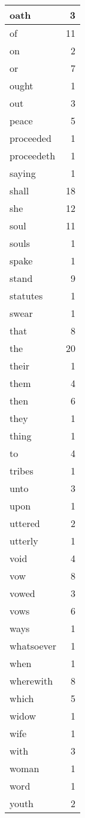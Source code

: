 \begin{center}
\begin{longtable}{l|r}
oath & 3\\ \hline 
of & 11\\ \hline 
on & 2\\ \hline 
or & 7\\ \hline 
ought & 1\\ \hline 
out & 3\\ \hline 
peace & 5\\ \hline 
proceeded & 1\\ \hline 
proceedeth & 1\\ \hline 
saying & 1\\ \hline 
shall & 18\\ \hline 
she & 12\\ \hline 
soul & 11\\ \hline 
souls & 1\\ \hline 
spake & 1\\ \hline 
stand & 9\\ \hline 
statutes & 1\\ \hline 
swear & 1\\ \hline 
that & 8\\ \hline 
the & 20\\ \hline 
their & 1\\ \hline 
them & 4\\ \hline 
then & 6\\ \hline 
they & 1\\ \hline 
thing & 1\\ \hline 
to & 4\\ \hline 
tribes & 1\\ \hline 
unto & 3\\ \hline 
upon & 1\\ \hline 
uttered & 2\\ \hline 
utterly & 1\\ \hline 
void & 4\\ \hline 
vow & 8\\ \hline 
vowed & 3\\ \hline 
vows & 6\\ \hline 
ways & 1\\ \hline 
whatsoever & 1\\ \hline 
when & 1\\ \hline 
wherewith & 8\\ \hline 
which & 5\\ \hline 
widow & 1\\ \hline 
wife & 1\\ \hline 
with & 3\\ \hline 
woman & 1\\ \hline 
word & 1\\ \hline 
youth & 2\\ \hline 
\end{longtable}
\end{center}



